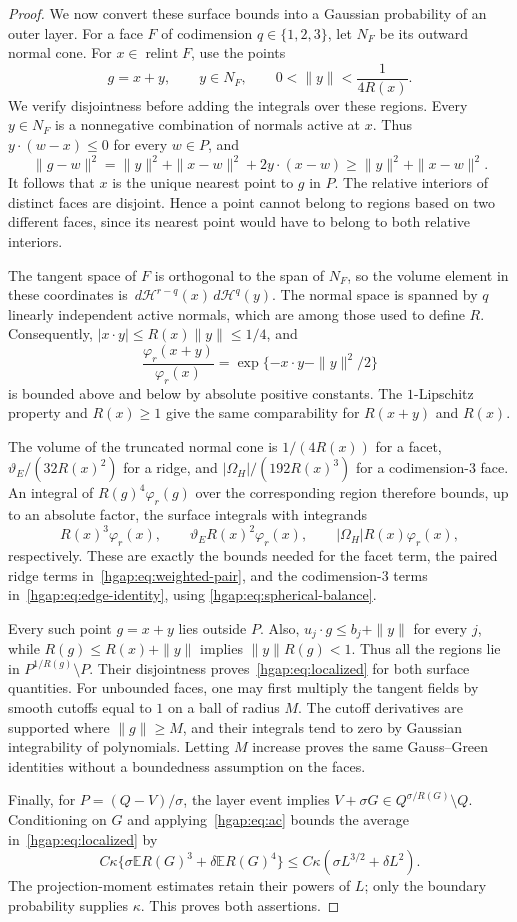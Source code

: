 \documentclass[11pt,letterpaper]{article}
\theoremstyle{remark}
\newcommand{\E}{\mathbb E}
\newcommand{\dd}{\,d}
\begin{document}
\begin{proof}
We now convert these surface bounds into a Gaussian probability of
an outer layer. For a face $F$ of codimension $q\in\{1,2,3\}$, let
$N_F$ be its outward normal cone. For $x\in\operatorname{relint}F$,
use the points
\[
 g=x+y,\qquad y\in N_F,\qquad 0<\|y\|<\frac1{4R(x)}.
\]
We verify disjointness before adding the integrals over these regions.
Every $y\in N_F$ is a nonnegative combination of normals active at
$x$. Thus $y\cdot(w-x)\le0$ for every $w\in P$, and
\[
 \|g-w\|^2=\|y\|^2+\|x-w\|^2+2y\cdot(x-w)
              \ge\|y\|^2+\|x-w\|^2.
\]
It follows that $x$ is the unique nearest point to $g$ in $P$.
The relative interiors of distinct faces are disjoint. Hence a point
cannot belong to regions based on two different faces, since its
nearest point would have to belong to both relative interiors.

The tangent space of $F$ is orthogonal to the span of $N_F$, so the
volume element in these coordinates is
$\dd\mathcal H^{r-q}(x)\dd\mathcal H^q(y)$.
The normal space is spanned by $q$ linearly independent active
normals, which are among those used to define $R$. Consequently,
$|x\cdot y|\le R(x)\|y\|\le1/4$, and
\[
 \frac{\varphi_r(x+y)}{\varphi_r(x)}
       =\exp\{-x\cdot y-\|y\|^2/2\}
\]
is bounded above and below by absolute positive constants. The
$1$-Lipschitz property and $R(x)\ge1$ give the same comparability for
$R(x+y)$ and $R(x)$.

The volume of the truncated normal cone is
$1/(4R(x))$ for a facet,
$\vartheta_E/(32R(x)^2)$ for a ridge, and
$|\Omega_H|/(192R(x)^3)$ for a codimension-$3$ face.
An integral of $R(g)^4\varphi_r(g)$ over the corresponding region
therefore bounds, up to an absolute factor, the surface integrals with
integrands
\[
 R(x)^3\varphi_r(x),\qquad
 \vartheta_E R(x)^2\varphi_r(x),\qquad
 |\Omega_H|R(x)\varphi_r(x),
\]
respectively. These are exactly the bounds needed for the facet term,
the paired ridge terms in~\eqref{hgap:eq:weighted-pair}, and the
codimension-$3$ terms in~\eqref{hgap:eq:edge-identity}, using
\eqref{hgap:eq:spherical-balance}.

Every such point $g=x+y$ lies outside $P$. Also,
$u_j\cdot g\le b_j+\|y\|$ for every $j$, while
$R(g)\le R(x)+\|y\|$ implies $\|y\|R(g)<1$.
Thus all the regions lie in $P^{1/R(g)}\setminus P$.
Their disjointness proves~\eqref{hgap:eq:localized} for both surface
quantities. For unbounded faces, one may first multiply the tangent
fields by smooth cutoffs equal to $1$ on a ball of radius $M$.
The cutoff derivatives are supported where $\|g\|\ge M$, and their
integrals tend to zero by Gaussian integrability of polynomials.
Letting $M$ increase proves the same Gauss--Green identities without
a boundedness assumption on the faces.

Finally, for $P=(Q-V)/\sigma$, the layer event implies
$V+\sigma G\in Q^{\sigma/R(G)}\setminus Q$.
Conditioning on $G$ and applying~\eqref{hgap:eq:ac} bounds
the average in~\eqref{hgap:eq:localized} by
\[
 C\kappa\{\sigma\E R(G)^3+\delta\E R(G)^4\}
 \le C\kappa(\sigma L^{3/2}+\delta L^2).
\]
The projection-moment estimates retain their powers of $L$; only the
boundary probability supplies $\kappa$. This proves both assertions.
\end{proof}
\end{document}
